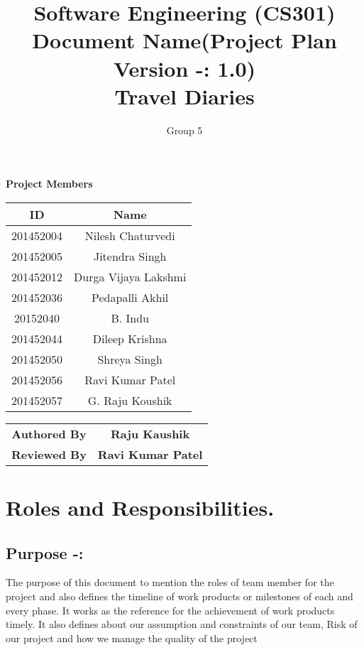 \documentclass[]{article}
\title{Software Engineering (CS301)\\ Document Name(Project Plan Version -: 1.0)\\Travel Diaries}
\author{Group 5}
\begin{document}
\maketitle


\begin{center}
\textbf{Project Members}\\
\vspace*{.6cm}
\begin{tabular}{|c|c|}
\hline
\textbf{ID} & \textbf{Name}\\
\hline
\hline
201452004 & Nilesh Chaturvedi\\
\hline
201452005 & Jitendra Singh\\
\hline
201452012 & Durga Vijaya Lakshmi\\
\hline
201452036 & Pedapalli Akhil\\
\hline
20152040 & B. Indu\\
\hline
201452044 & Dileep Krishna\\
\hline
201452050 & Shreya Singh\\
\hline
201452056 & Ravi Kumar Patel\\
\hline
201452057 & G. Raju Koushik\\
\hline
\end{tabular}

\vspace*{1cm}

\begin{tabular}{|c|c|}
\hline
\textbf{Authored By} & \textbf{Raju Kaushik }\\
\textbf{Reviewed By} & \textbf{Ravi Kumar Patel}\\
\hline
\end{tabular}
\end{center}

\newpage
\tableofcontents
\newpage


\section{Roles and Responsibilities.}
\subsection{Purpose -:}
The purpose of this document to mention the roles of team member for the project and also
defines the timeline of work products or milestones of each and every phase. It works as the
reference for the achievement of work products timely. It also defines about our assumption and
constraints of our team, Risk of our project and how we manage the quality of the project
\end{document}
